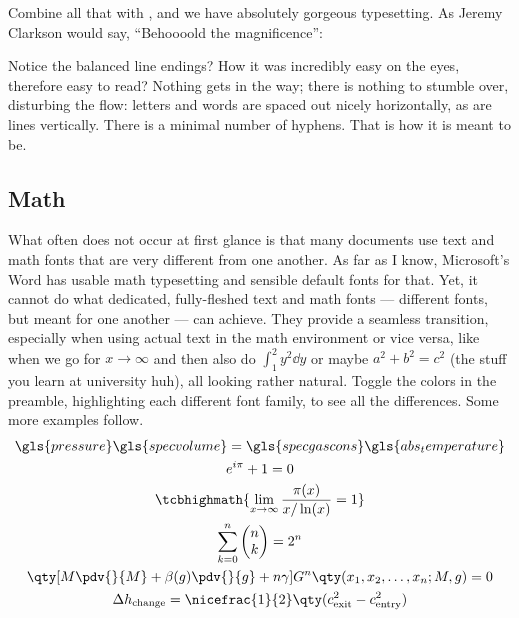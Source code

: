 Combine all that with , and we have absolutely gorgeous typesetting.
As Jeremy Clarkson would say, \enquote{Behoooold the magnificence}:

\vspace{1\baselineskip}
\parbox{0.9\linewidth}{%
\textcolor{g1}{\kant[1]}
}
\vspace{1\baselineskip}

\noindent Notice the balanced line endings?
How it was incredibly easy on the eyes, therefore easy to read?
Nothing gets in the way; there is nothing to stumble over, disturbing the flow: letters and words are spaced out nicely horizontally, as are lines vertically.
There is a minimal number of hyphens.
That is how it is meant to be.

\subsection{Math}
What often does not occur at first glance is that many documents use text and math fonts that are very different from one another.
As far as I know, Microsoft's Word has usable math typesetting and sensible default fonts for that.
Yet, it cannot do what dedicated, fully-fleshed text and math fonts --- different fonts, but meant for one another --- can achieve.
They provide a seamless transition, especially when using actual text in the math environment or vice versa, like when we go for \(x \to \infty\) and then also do \(\int_{1}^{2} y^2 \dd{y}\) or maybe \(a^2 + b^2 = c^2\) (the stuff you learn at university huh), all looking rather natural.
Toggle the colors in the preamble, highlighting each different font family, to see all the differences.
Some more examples follow.
\begin{gather}
\allowdisplaybreaks
	\gls{pressure}\gls{specvolume} = \gls{specgascons}\gls{abs_temperature}\label{eq:click_me}\\
	e^{i\pi} + 1 = 0\\
	\tcbhighmath{\lim\limits_{x \to \infty} \frac{\pi(x)}{x / \ln(x)} = 1}\label{eq:highlighted}\\
	\sum_{k = 0}^{n} %
	\begin{pmatrix}%
		n \\ k
	\end{pmatrix}%
	= 2^{n}\\
	\qty[M \pdv{}{M} + \beta(g) \pdv{}{g} + n\gamma] G^{n} \qty(x_{1}, x_{2}, \dots, x_{n}; M, g) = 0\\
	\Delta h_{\text{change}} = \nicefrac{1}{2}\qty(c^2_{\text{exit}} - c^2_{\text{entry}})
\end{gather}

